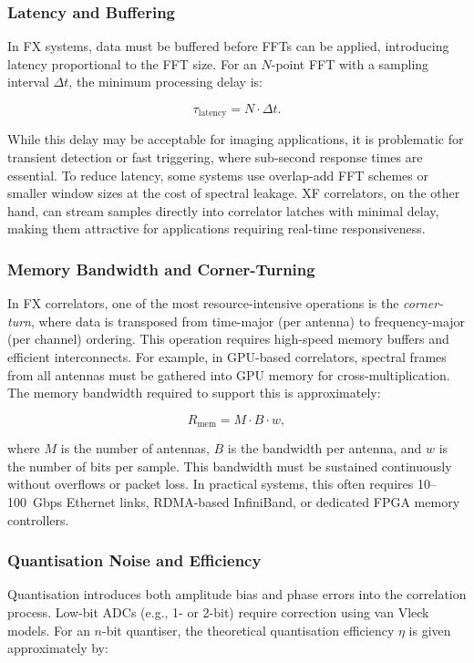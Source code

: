         \subsubsection{Latency and Buffering}
        In FX systems, data must be buffered before FFTs can be applied, introducing latency proportional to the FFT size. For an \( N \)-point FFT with a sampling interval \( \Delta t \), the minimum processing delay is:
        
        \begin{equation}
            \tau_{\text{latency}} = N \cdot \Delta t.
        \end{equation}

        While this delay may be acceptable for imaging applications, it is problematic for transient detection or fast triggering, where sub-second response times are essential. To reduce latency, some systems use overlap-add FFT schemes or smaller window sizes at the cost of spectral leakage. XF correlators, on the other hand, can stream samples directly into correlator latches with minimal delay, making them attractive for applications requiring real-time responsiveness.

        \subsubsection{Memory Bandwidth and Corner-Turning}
        In FX correlators, one of the most resource-intensive operations is the \textit{corner-turn}, where data is transposed from time-major (per antenna) to frequency-major (per channel) ordering. This operation requires high-speed memory buffers and efficient interconnects. For example, in GPU-based correlators, spectral frames from all antennas must be gathered into GPU memory for cross-multiplication. The memory bandwidth required to support this is approximately:
        
        \begin{equation}
            R_{\text{mem}} = M \cdot B \cdot w,
        \end{equation}

        where \( M \) is the number of antennas, \( B \) is the bandwidth per antenna, and \( w \) is the number of bits per sample. This bandwidth must be sustained continuously without overflows or packet loss. In practical systems, this often requires 10--100~Gbps Ethernet links, RDMA-based InfiniBand, or dedicated FPGA memory controllers.

        \subsubsection{Quantisation Noise and Efficiency}
        Quantisation introduces both amplitude bias and phase errors into the correlation process. Low-bit ADCs (e.g., 1- or 2-bit) require correction using van Vleck models. For an \( n \)-bit quantiser, the theoretical quantisation efficiency \( \eta \) is given approximately by:

